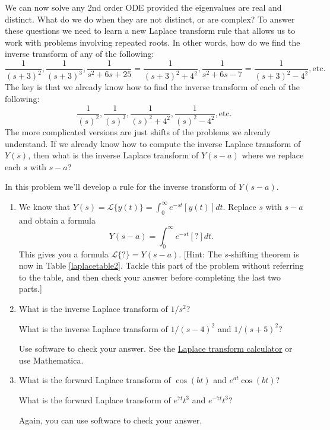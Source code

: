 We can now solve any 2nd order ODE provided the eigenvalues are real and distinct. What do we do when they are not distinct, or are complex?  To answer these questions we need to learn a new Laplace transform rule that allows us to work with problems involving repeated roots. In other words, how do we find the inverse transform of any of the following:
$$\frac{1}{(s+3)^2},\frac{1}{(s+3)^3},\frac{1}{s^2+6s+25}=\frac{1}{(s+3)^2+4^2},\frac{1}{s^2+6s-7}=\frac{1}{(s+3)^2-4^2}, \text{etc.}$$
The key is that we already know how to find the inverse transform of each of the following:
$$\frac{1}{(s)^2},\frac{1}{(s)^3},\frac{1}{(s)^2+4^2},\frac{1}{(s)^2-4^2},\text{etc.}$$
The more complicated versions are just shifts of the problems we already understand.  If we already know how to compute the inverse Laplace transform of $Y(s)$, then what is the inverse Laplace transform of $Y(s-a)$ where we replace each $s$ with $s-a$?

\begin{problem}
 In this problem we'll develop a rule for the inverse transform of $Y(s-a)$. 
\begin{enumerate}
 \item We know that $Y(s) = \mathscr{L}\{y(t)\} = \int_0^\infty e^{-st}[y(t)]dt$. 
 Replace $s$ with $s-a$ and obtain a formula
$$Y(s-a) = \int_0^\infty e^{-st}[?] dt.$$ This gives you a formula $\mathscr{L}\{?\} = Y(s-a)$.
[Hint: The $s$-shifting theorem is now in Table \ref{laplacetable2}.  Tackle this part of the problem without referring to the table, and then check your answer before completing the last two parts.]
 \item What is the inverse Laplace transform of $1/s^2$?  

 What is the inverse Laplace transform of $1/(s-4)^2$ and $1/(s+5)^2$?

 Use software to check your answer.  See the \href{\urllaplacetransforms}{Laplace transform calculator} or use Mathematica. 
 \item What is the forward Laplace transform of $\cos(bt)$ and $e^{at} \cos (bt)$? 

 What is the forward Laplace transform of $e^{7t}t^3$ and $e^{-7t}t^3$? 

Again, you can use software to check your answer.
\end{enumerate}
\end{problem}

